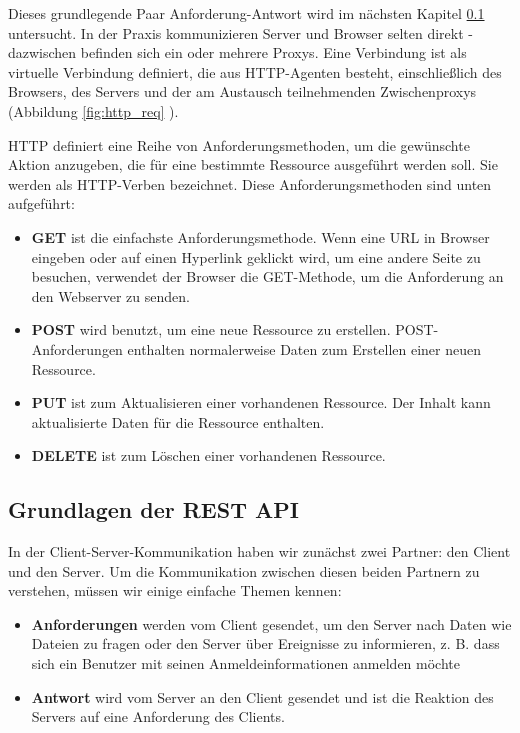 Dieses grundlegende Paar Anforderung-Antwort wird im nächsten Kapitel \ref{sec:theorie:api} untersucht. In der Praxis kommunizieren Server und Browser selten direkt - dazwischen befinden sich ein oder mehrere Proxys. Eine Verbindung ist als virtuelle Verbindung definiert, die aus HTTP-Agenten besteht, einschließlich des Browsers, des Servers und der am Austausch teilnehmenden Zwischenproxys (Abbildung \ref{fig:http_req} \cite[pp.33-34]{shklar:webapplication}).


HTTP definiert eine Reihe von Anforderungsmethoden, um die gewünschte Aktion anzugeben, die für eine bestimmte Ressource ausgeführt werden soll. Sie werden als HTTP-Verben bezeichnet.
Diese Anforderungsmethoden sind unten aufgeführt:
\begin{itemize}
	\item \textbf{GET} ist die einfachste Anforderungsmethode. Wenn eine URL in Browser eingeben oder auf einen Hyperlink geklickt wird, um eine andere Seite zu besuchen, verwendet der Browser die GET-Methode, um die Anforderung an den Webserver zu senden.
	\item \textbf{POST} wird benutzt, um eine neue Ressource zu erstellen. POST-Anforderungen enthalten normalerweise Daten zum Erstellen einer neuen Ressource.
	\item \textbf{PUT} ist zum Aktualisieren einer vorhandenen Ressource. Der Inhalt kann aktualisierte Daten für die Ressource enthalten.
	\item \textbf{DELETE} ist zum Löschen einer vorhandenen Ressource.
\end{itemize}

\subsection{Grundlagen der REST API}
\label{sec:theorie:api}
In der Client-Server-Kommunikation haben wir zunächst zwei Partner: den Client und den Server. Um die Kommunikation zwischen diesen beiden Partnern zu verstehen, müssen wir einige einfache Themen kennen:
\begin{itemize}
\item \textbf{Anforderungen} werden vom Client gesendet, um den Server nach Daten wie Dateien zu fragen oder den Server über Ereignisse zu informieren, z. B. dass sich ein Benutzer mit seinen Anmeldeinformationen anmelden möchte
\item \textbf{Antwort} wird vom Server an den Client gesendet und ist die Reaktion des Servers auf eine Anforderung des Clients. 
\end{itemize}

